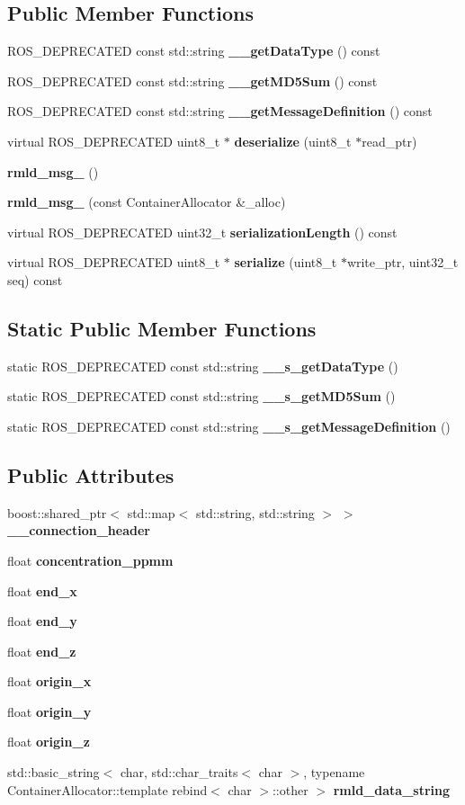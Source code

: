 \subsection*{Public Member Functions}
\begin{DoxyCompactItemize}
\item 
ROS\_\-DEPRECATED const std::string {\bf \_\-\_\-getDataType} () const 
\item 
ROS\_\-DEPRECATED const std::string {\bf \_\-\_\-getMD5Sum} () const 
\item 
ROS\_\-DEPRECATED const std::string {\bf \_\-\_\-getMessageDefinition} () const 
\item 
virtual ROS\_\-DEPRECATED uint8\_\-t $\ast$ {\bf deserialize} (uint8\_\-t $\ast$read\_\-ptr)
\item 
{\bf rmld\_\-msg\_\-} ()
\item 
{\bf rmld\_\-msg\_\-} (const ContainerAllocator \&\_\-alloc)
\item 
virtual ROS\_\-DEPRECATED uint32\_\-t {\bf serializationLength} () const 
\item 
virtual ROS\_\-DEPRECATED uint8\_\-t $\ast$ {\bf serialize} (uint8\_\-t $\ast$write\_\-ptr, uint32\_\-t seq) const 
\end{DoxyCompactItemize}
\subsection*{Static Public Member Functions}
\begin{DoxyCompactItemize}
\item 
static ROS\_\-DEPRECATED const std::string {\bf \_\-\_\-s\_\-getDataType} ()
\item 
static ROS\_\-DEPRECATED const std::string {\bf \_\-\_\-s\_\-getMD5Sum} ()
\item 
static ROS\_\-DEPRECATED const std::string {\bf \_\-\_\-s\_\-getMessageDefinition} ()
\end{DoxyCompactItemize}
\subsection*{Public Attributes}
\begin{DoxyCompactItemize}
\item 
boost::shared\_\-ptr$<$ std::map$<$ std::string, std::string $>$ $>$ {\bf \_\-\_\-connection\_\-header}
\item 
float {\bf concentration\_\-ppmm}
\item 
float {\bf end\_\-x}
\item 
float {\bf end\_\-y}
\item 
float {\bf end\_\-z}
\item 
float {\bf origin\_\-x}
\item 
float {\bf origin\_\-y}
\item 
float {\bf origin\_\-z}
\item 
std::basic\_\-string$<$ char, std::char\_\-traits$<$ char $>$, typename ContainerAllocator::template rebind$<$ char $>$::other $>$ {\bf rmld\_\-data\_\-string}
\end{DoxyCompactItemize}

